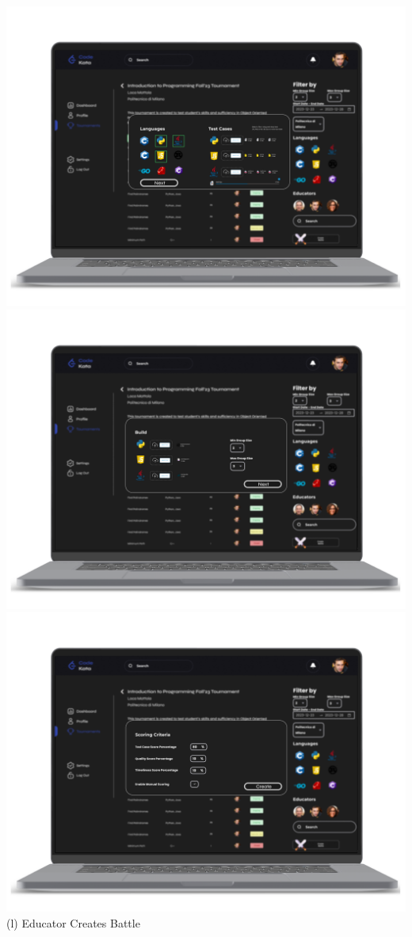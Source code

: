 \begin{center}
\includegraphics[scale=0.13]{Images/ui-ux/educator_creates_battle/educator_creates_battle_4.png}
\includegraphics[scale=0.13]{Images/ui-ux/educator_creates_battle/educator_creates_battle_5.png}
\includegraphics[scale=0.13]{Images/ui-ux/educator_creates_battle/educator_creates_battle_6.png}
        (l) Educator Creates Battle
\end{center}
